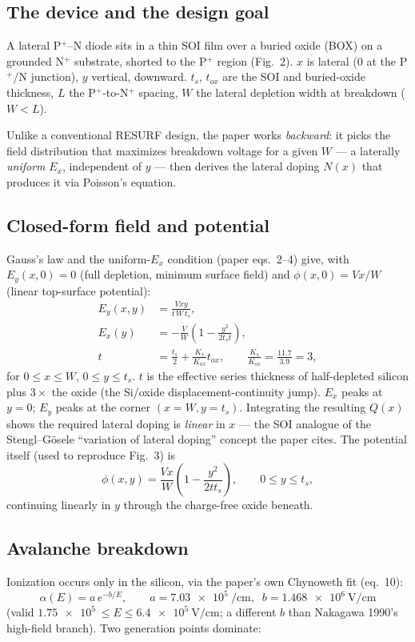 \documentclass[11pt]{article}
\newcommand{\ts}{t_{s}}
\newcommand{\tox}{t_{ox}}
\newcommand{\Wdep}{W}
\begin{document}
\subsection{The device and the design goal}
A lateral P$^+$--N diode sits in a thin SOI film over a buried oxide (BOX) on a
grounded N$^+$ substrate, shorted to the P$^+$ region (Fig.~2). $x$ is lateral
(0 at the P$^+$/N junction), $y$ vertical, downward. $\ts$, $\tox$ are the SOI
and buried-oxide thickness, $L$ the P$^+$-to-N$^+$ spacing, $\Wdep$ the lateral
depletion width at breakdown ($\Wdep<L$).

Unlike a conventional RESURF design, the paper works \emph{backward}: it picks
the field distribution that maximizes breakdown voltage for a given $\Wdep$
--- a laterally \emph{uniform} $E_x$, independent of $y$ --- then derives the
lateral doping $N(x)$ that produces it via Poisson's equation.

\subsection{Closed-form field and potential}
Gauss's law and the uniform-$E_x$ condition (paper eqs.~2--4) give, with
$E_y(x,0)=0$ (full depletion, minimum surface field) and
$\phi(x,0)=Vx/\Wdep$ (linear top-surface potential):
\begin{align}
E_y(x,y) &= \frac{Vxy}{t\,\Wdep\,\ts}, \\
E_x(y) &= -\frac{V}{\Wdep}\left(1-\frac{y^2}{2\ts t}\right), \\
t &= \frac{\ts}{2} + \frac{K_s}{K_{ox}}\tox, \qquad \frac{K_s}{K_{ox}}=\frac{11.7}{3.9}=3,
\end{align}
for $0\le x\le\Wdep$, $0\le y\le\ts$. $t$ is the effective series thickness of
half-depleted silicon plus $3\times$ the oxide (the Si/oxide
displacement-continuity jump). $E_x$ peaks at $y=0$; $E_y$ peaks at the corner
$(x=\Wdep,y=\ts)$. Integrating the resulting $Q(x)$ shows the required lateral
doping is \emph{linear} in $x$ --- the SOI analogue of the
Stengl--G\"osele ``variation of lateral doping'' concept the paper cites.
The potential itself (used to reproduce Fig.~3) is
\begin{equation}
\phi(x,y) = \frac{Vx}{\Wdep}\left(1-\frac{y^2}{2tt_s}\right), \qquad 0\le y\le \ts,
\end{equation}
continuing linearly in $y$ through the charge-free oxide beneath.

\subsection{Avalanche breakdown}
Ionization occurs only in the silicon, via the paper's own Chynoweth fit
(eq.~10):
\begin{equation}
\alpha(E) = a\,e^{-b/E}, \qquad a = \SI{7.03e5}{\per\centi\meter},\;\;
b = \SI{1.468e6}{\volt\per\centi\meter}
\end{equation}
(valid $\SI{1.75e5}{}\le E\le\SI{6.4e5}{\volt\per\centi\meter}$; a different $b$
than Nakagawa 1990's high-field branch). Two generation points dominate:
\end{document}
